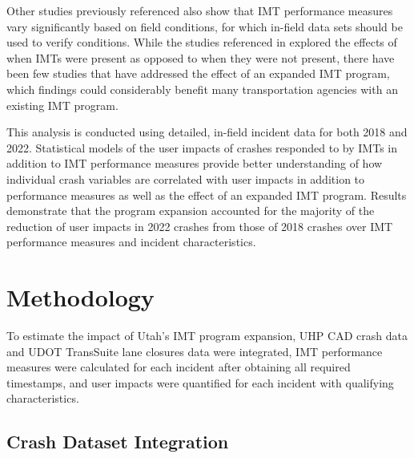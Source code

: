 \documentclass[
  letterpaper,
  authoryear]{elsarticle}
\begin{document}
Other studies previously referenced also show that IMT performance
measures vary significantly based on field conditions, for which
in-field data sets should be used to verify conditions. While the
studies referenced in \citet{shah_development_2022} explored the effects
of when IMTs were present as opposed to when they were not present,
there have been few studies that have addressed the effect of an
expanded IMT program, which findings could considerably benefit many
transportation agencies with an existing IMT program.

This analysis is conducted using detailed, in-field incident data for
both 2018 and 2022. Statistical models of the user impacts of crashes
responded to by IMTs in addition to IMT performance measures provide
better understanding of how individual crash variables are correlated
with user impacts in addition to performance measures as well as the
effect of an expanded IMT program. Results demonstrate that the program
expansion accounted for the majority of the reduction of user impacts in
2022 crashes from those of 2018 crashes over IMT performance measures
and incident characteristics.


\section{Methodology}\label{methodology}

To estimate the impact of Utah's IMT program expansion, UHP CAD crash
data and UDOT TransSuite lane closures data were integrated, IMT
performance measures were calculated for each incident after obtaining
all required timestamps, and user impacts were quantified for each
incident with qualifying characteristics.

\subsection{Crash Dataset Integration}\label{crash-dataset-integration}
\end{document}
